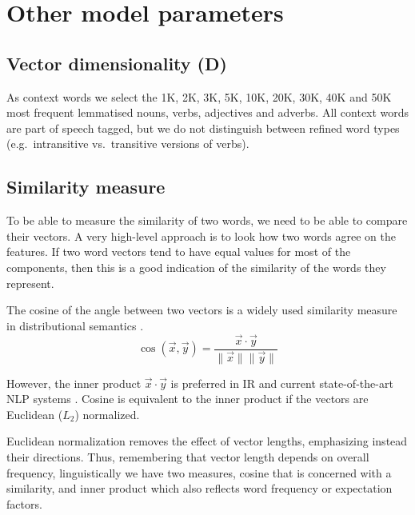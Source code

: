 \section{Other model parameters}
\label{sec:other-model-paramt}

\subsection{Vector dimensionality (D)}
\label{sec:vect-dimens}

As context words we select the 1K, 2K, 3K, 5K, 10K, 20K, 30K, 40K and 50K most frequent lemmatised nouns, verbs, adjectives and adverbs. All context words are part of speech tagged, but we do not distinguish between refined word types (e.g.~intransitive vs.~transitive versions of verbs).

\subsection{Similarity measure}
\label{sec:similarity-measure}

To be able to measure the similarity of two words, we need to be able to compare their vectors. A very high-level approach is to look how two words agree on the features. If two word vectors tend to have equal values for most of the components, then this is a good indication of the similarity of the words they represent.

The cosine of the angle between two vectors is a widely used similarity measure in distributional semantics \cite{Turney:2010:FMV:1861751.1861756,lapesa2014large}.
%
\begin{equation*}
  \label{eq:cos}
  \cos(\vec{x}, \vec{y}) = \frac{\vec{x} \cdot \vec{y}}
                                {\|\vec{x}\| \|\vec{y}\|}
\end{equation*}

However, the inner product $\vec{x} \cdot \vec{y}$ is preferred in IR and current state-of-the-art NLP systems \cite{mikolov2013distributed,mikolov2013linguistic,TACL570}. Cosine is equivalent to the inner product if the vectors are Euclidean ($L_2$) normalized.

Euclidean normalization removes the effect of vector lengths, emphasizing instead their directions. Thus, remembering that vector length depends on overall frequency, linguistically we have two measures, cosine that is concerned with a similarity, and inner product which also reflects word frequency or expectation factors.

